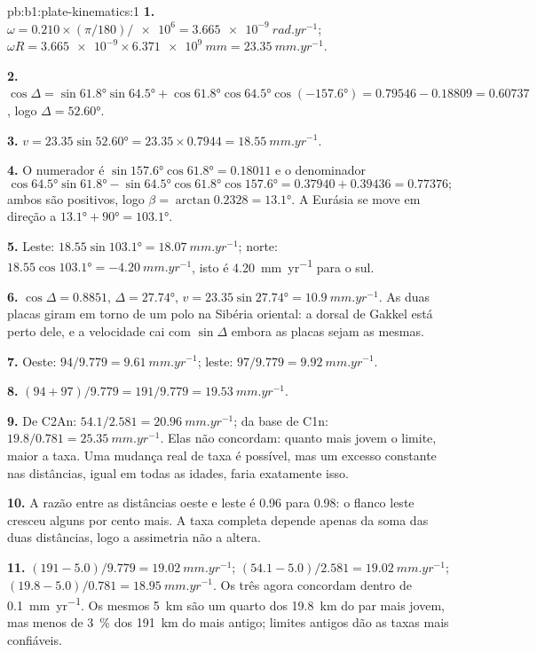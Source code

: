 \begin{solution}{pb:b1:plate-kinematics:1}
\textbf{1.} $\omega = 0.210\times(\pi/180)/\num{e6} = \qty{3.665e-9}{rad.yr^{-1}}$;
$\omega R = \num{3.665e-9}\times\qty{6.371e9}{mm} = \qty{23.35}{mm.yr^{-1}}$.

\textbf{2.} $\cos\Delta = \sin\ang{61.8}\sin\ang{64.5} + \cos\ang{61.8}
\cos\ang{64.5}\cos(\ang{-157.6}) = 0.79546 - 0.18809 = 0.60737$, logo
$\Delta = \ang{52.60}$.

\textbf{3.} $v = 23.35\sin\ang{52.60} = 23.35\times0.7944 =
\qty{18.55}{mm.yr^{-1}}$.

\textbf{4.} O numerador é $\sin\ang{157.6}\cos\ang{61.8} = 0.18011$ e o
denominador
\[
  \cos\ang{64.5}\sin\ang{61.8} - \sin\ang{64.5}\cos\ang{61.8}\cos\ang{157.6} =
  0.37940 + 0.39436 = 0.77376;
\]
ambos são positivos, logo $\beta = \arctan 0.2328 =
\ang{13.1}$. A Eurásia se move em direção a $\ang{13.1} + \ang{90} = \ang{103.1}$.

\textbf{5.} Leste: $18.55\sin\ang{103.1} = \qty{18.07}{mm.yr^{-1}}$; norte:
$18.55\cos\ang{103.1} = \qty{-4.20}{mm.yr^{-1}}$, isto é \qty{4.20}{mm.yr^{-1}}
para o sul.

\textbf{6.} $\cos\Delta = 0.8851$, $\Delta = \ang{27.74}$, $v = 23.35
\sin\ang{27.74} = \qty{10.9}{mm.yr^{-1}}$. As duas placas giram em torno de um polo na
Sibéria oriental: a dorsal de Gakkel está perto dele, e a velocidade cai com
$\sin\Delta$ embora as placas sejam as mesmas.

\textbf{7.} Oeste: $94/9.779 = \qty{9.61}{mm.yr^{-1}}$; leste: $97/9.779 =
\qty{9.92}{mm.yr^{-1}}$.

\textbf{8.} $(94 + 97)/9.779 = 191/9.779 = \qty{19.53}{mm.yr^{-1}}$.

\textbf{9.} De C2An: $54.1/2.581 = \qty{20.96}{mm.yr^{-1}}$; da base de
C1n: $19.8/0.781 = \qty{25.35}{mm.yr^{-1}}$. Elas não concordam: quanto mais jovem o
limite, maior a taxa. Uma mudança real de taxa é possível, mas um
excesso constante nas distâncias, igual em todas as idades, faria exatamente isso.

\textbf{10.} A razão entre as distâncias oeste e leste é 0.96 para 0.98: o
flanco leste cresceu alguns por cento mais. A taxa completa depende apenas da
soma das duas distâncias, logo a assimetria não a altera.

\textbf{11.} $(191 - 5.0)/9.779 = \qty{19.02}{mm.yr^{-1}}$;
$(54.1 - 5.0)/2.581 = \qty{19.02}{mm.yr^{-1}}$; $(19.8 - 5.0)/0.781 =
\qty{18.95}{mm.yr^{-1}}$. Os três agora concordam dentro de
\qty{0.1}{mm.yr^{-1}}. Os mesmos \qty{5}{km} são um quarto dos \qty{19.8}{km}
do par mais jovem, mas menos de \qty{3}{\percent} dos \qty{191}{km} do
mais antigo; limites antigos dão as taxas mais confiáveis.


\end{solution}
